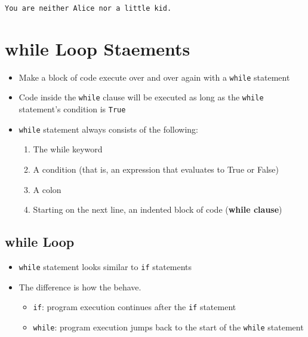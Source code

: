 \documentclass[11pt]{article}
\providecommand{\tightlist}{%
      \setlength{\itemsep}{0pt}\setlength{\parskip}{0pt}}
\begin{document}
    \begin{Verbatim}[commandchars=\\\{\}]
You are neither Alice nor a little kid.

    \end{Verbatim}

    \hypertarget{while-loop-staements}{%
\section{while Loop Staements}\label{while-loop-staements}}

\begin{itemize}
\item
  Make a block of code execute over and over again with a \texttt{while}
  statement
\item
  Code inside the \texttt{while} clause will be executed as long as the
  \texttt{while} statement's condition is \texttt{True}
\item
  \texttt{while} statement always consists of the following:

  \begin{enumerate}
  \def\labelenumi{\arabic{enumi}.}
  \tightlist
  \item
    The while keyword
  \item
    A condition (that is, an expression that evaluates to True or False)
  \item
    A colon
  \item
    Starting on the next line, an indented block of code (\textbf{while
    clause})
  \end{enumerate}
\end{itemize}

    \hypertarget{while-loop}{%
\subsection{while Loop}\label{while-loop}}

\begin{itemize}
\tightlist
\item
  \texttt{while} statement looks similar to \texttt{if} statements
\item
  The difference is how the behave.

  \begin{itemize}
  \tightlist
  \item
    \texttt{if}: program execution continues after the \texttt{if}
    statement
  \item
    \texttt{while}: program execution jumps back to the start of the
    \texttt{while} statement
  \end{itemize}
\end{itemize}
\end{document}
